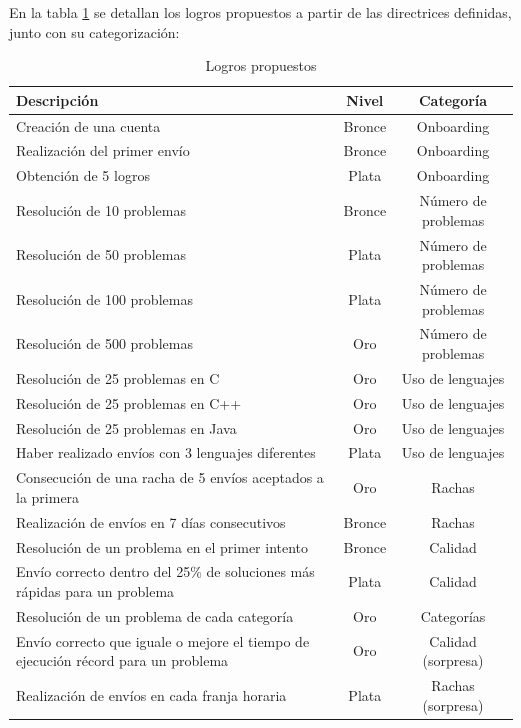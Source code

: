 En la tabla \ref{tab:logros} se detallan los logros propuestos a partir de las directrices definidas, junto con su categorización:

\begin{table}[h]
\centering
\small
\begin{tabular}{p{8cm}cc}
\toprule
\textbf{Descripción} & \textbf{Nivel} & \textbf{Categoría} \\
\midrule
Creación de una cuenta & Bronce & Onboarding \\
\midrule
Realización del primer envío & Bronce & Onboarding \\
\midrule
Obtención de 5 logros & Plata & Onboarding \\
\midrule
Resolución de 10 problemas & Bronce & Número de problemas \\
\midrule
Resolución de 50 problemas & Plata & Número de problemas \\
\midrule
Resolución de 100 problemas & Plata & Número de problemas \\
\midrule
Resolución de 500 problemas & Oro & Número de problemas \\
\midrule
Resolución de 25 problemas en C & Oro & Uso de lenguajes \\
\midrule
Resolución de 25 problemas en C++ & Oro & Uso de lenguajes \\
\midrule
Resolución de 25 problemas en Java & Oro & Uso de lenguajes \\
\midrule
Haber realizado envíos con 3 lenguajes diferentes & Plata & Uso de lenguajes \\
\midrule
Consecución de una racha de 5 envíos aceptados a la primera & Oro & Rachas \\
\midrule
Realización de envíos en 7 días consecutivos & Bronce & Rachas \\
\midrule
Resolución de un problema en el primer intento & Bronce & Calidad \\
\midrule
Envío correcto dentro del 25\% de soluciones más rápidas para un problema & Plata & Calidad \\
\midrule
Resolución de un problema de cada categoría & Oro & Categorías \\
\midrule
Envío correcto que iguale o mejore el tiempo de ejecución récord para un problema & Oro & Calidad (sorpresa) \\
\midrule
Realización de envíos en cada franja horaria & Plata & Rachas (sorpresa) \\
\bottomrule
\end{tabular}
\caption{Logros propuestos}
\label{tab:logros}
\end{table}

